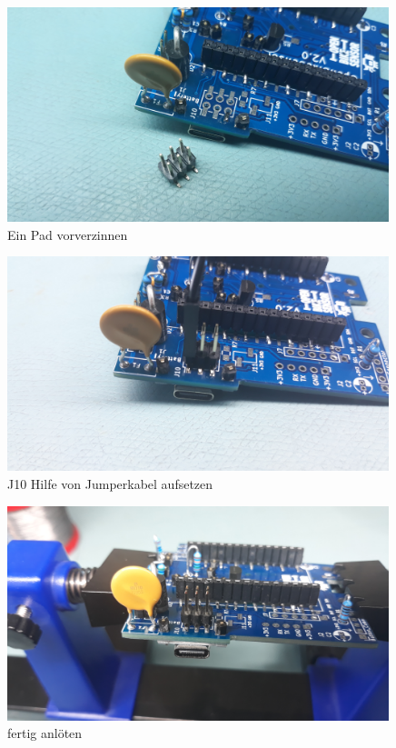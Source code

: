 \documentclass[12pt, a4paper]{article}		%
\begin{document}
\begin{figure}[H]
	\centering
		\includegraphics[width=0.99\textwidth]{Grafiken/20200726_181456.jpg}
	\caption{Ein Pad vorverzinnen}
	\label{fig:20200726_181456}
\end{figure}

\begin{figure}[H]
	\centering
		\includegraphics[width=0.99\textwidth]{Grafiken/20200726_181552.jpg}
	\caption{J10 Hilfe von Jumperkabel aufsetzen}
	\label{fig:20200726_181552}
\end{figure}


\begin{figure}[H]
	\centering
		\includegraphics[width=0.99\textwidth]{Grafiken/20200726_181810.jpg}
	\caption{fertig anlöten}
	\label{fig:20200726_181810}
\end{figure}
\end{document}
